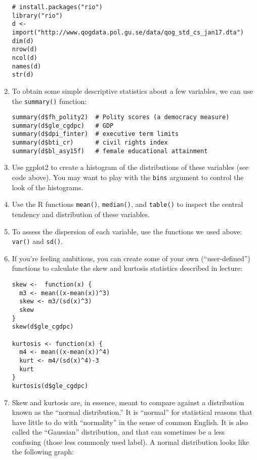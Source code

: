 \documentclass[a4paper,12pt]{article}
\begin{document}
\begin{enumerate}
\begin{verbatim}
# install.packages("rio")
library("rio")
d <- import("http://www.qogdata.pol.gu.se/data/qog_std_cs_jan17.dta")
dim(d)
nrow(d)
ncol(d)
names(d)
str(d)
\end{verbatim}

\item To obtain some simple descriptive statistics about a few variables, we can use the \texttt{summary()} function:

\begin{verbatim}
summary(d$fh_polity2)  # Polity scores (a democracy measure)
summary(d$gle_cgdpc)   # GDP
summary(d$dpi_finter)  # executive term limits
summary(d$bti_cr)      # civil rights index
summary(d$bl_asy15f)   # female educational attainment
\end{verbatim}

\item Use ggplot2 to create a histogram of the distributions of these variables (see code above). You may want to play with the \texttt{bins} argument to control the look of the histograms.

\item Use the R functions \texttt{mean()}, \texttt{median()}, and \texttt{table()} to inspect the central tendency and distribution of these variables.

\item To assess the dispersion of each variable, use the functions we used above: \texttt{var()} and \texttt{sd()}.

\item If you're feeling ambitious, you can create some of your own (``user-defined'') functions to calculate the skew and kurtosis statistics described in lecture:

\begin{verbatim}
skew <-  function(x) {
  m3 <- mean((x-mean(x))^3)
  skew <- m3/(sd(x)^3)
  skew
}
skew(d$gle_cgdpc)

kurtosis <- function(x) {  
  m4 <- mean((x-mean(x))^4) 
  kurt <- m4/(sd(x)^4)-3  
  kurt
}
kurtosis(d$gle_cgdpc)
\end{verbatim}

\item Skew and kurtosis are, in essence, meant to compare against a distribution known as the ``normal distribution.'' It is ``normal'' for statistical reasons that have little to do with ``normality'' in the sense of common English. It is also called the ``Gaussian'' distribution, and that can sometimes be a less confusing (those less commonly used label). A normal distribution looks like the following graph:


\end{enumerate}
\end{document}
